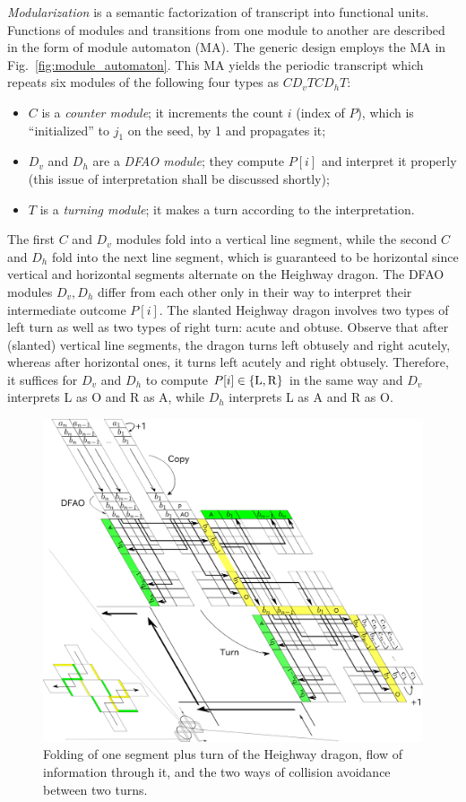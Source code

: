 \documentclass[dvipdfmx,review]{elsarticle}
\begin{document}
\textit{Modularization} is a semantic factorization of transcript into functional units. 
Functions of modules and transitions from one module to another are described in the form of module automaton (MA). 
The generic design employs the MA in Fig.~\ref{fig:module_automaton}.
This MA yields the periodic transcript which repeats six modules of the following four types as $C D_v T C D_h T$:
\begin{itemize}
\item $C$ is a \textit{counter module}; it increments the count $i$ (index of $P$), which is ``initialized'' to $j_1$ on the seed, by 1 and propagates it; 
\item $D_v$ and $D_h$ are a \textit{DFAO module}; they compute $P[i]$ and interpret it properly (this issue of interpretation shall be discussed shortly); 
\item $T$ is a \textit{turning module}; it makes a turn according to the interpretation. 
\end{itemize}
The first $C$ and $D_v$ modules fold into a vertical line segment, while the second $C$ and $D_h$ fold into the next line segment, which is guaranteed to be horizontal since vertical and horizontal segments alternate on the Heighway dragon. 
The DFAO modules $D_v, D_h$ differ from each other only in their way to interpret their intermediate outcome $P[i]$. 
The slanted Heighway dragon involves two types of left turn as well as two types of right turn: acute and obtuse. 
Observe that after (slanted) vertical line segments, the dragon turns left obtusely and right acutely, whereas after horizontal ones, it turns left acutely and right obtusely. 
Therefore, it suffices for $D_v$ and $D_h$ to compute $P[i] \in \{{\rm L}, {\rm R}\}$ in the same way and $D_v$ interprets L as O and R as A, while $D_h$ interprets L as A and R as O. 

\begin{figure}[tb]
\centering
\includegraphics[width=0.8\linewidth]{Figs/dragon_vol5.png}
\caption{
Folding of one segment plus turn of the Heighway dragon, flow of information through it, and the two ways of collision avoidance between two turns.
}
\label{fig:abst_dragon}
\end{figure}
\end{document}
